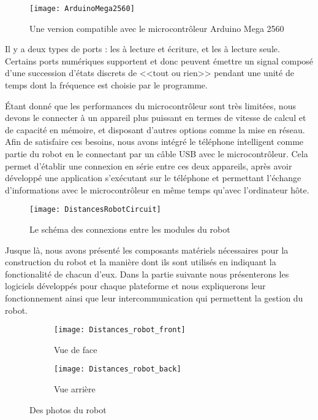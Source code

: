 \begin{figure}[h]
\begin{center}
\texttt{[image: ArduinoMega2560]}
\caption{Une version compatible avec le microcontrôleur Arduino Mega 2560}
\end{center}
\end{figure}

Il y a deux types de ports : les  à lecture et
écriture, et les  à lecture seule. Certains ports
numériques supportent  et donc peuvent
émettre un signal composé d'une succession d'états discrets de <<tout ou rien>>
pendant une unité de temps dont la fréquence est choisie par le programme.

Étant donné que les performances du microcontrôleur sont très limitées, nous
devons le connecter à un appareil plus puissant en termes de vitesse
de calcul et de capacité en mémoire, et disposant d'autres options comme la
mise en réseau. Afin de satisfaire ces besoins, nous avons intégré le téléphone
intelligent  comme partie du robot en le connectant
par un câble USB avec le microcontrôleur. Cela permet d'établir une connexion en série entre
ces deux appareils, après avoir développé une application s'exécutant
sur le téléphone et permettant l'échange d'informations avec le microcontrôleur
en même temps qu'avec l'ordinateur hôte.

\begin{figure}[H]
\begin{center}
\texttt{[image: DistancesRobotCircuit]}
\caption{Le schéma des connexions entre les modules du robot}
\end{center}
\end{figure}

Jusque là, nous avons présenté les composants matériels nécessaires pour la
construction du robot et la manière dont ils sont utilisés en indiquant la
fonctionalité de chacun d'eux. Dans la partie suivante nous présenterons les
logiciels développés pour chaque plateforme et nous expliquerons leur fonctionnement
ainsi que leur intercommunication qui permettent la gestion du robot.

\begin{figure}[h]
\begin{center}
  \begin{subfigure}{0.49\textwidth}
    \texttt{[image: Distances\_robot\_front]}
    \caption{Vue de face}
  \end{subfigure}
  \hfill
  \begin{subfigure}{0.49\textwidth}
    \texttt{[image: Distances\_robot\_back]}
    \caption{Vue arrière}
  \end{subfigure}
  \caption{Des photos du robot}
\end{center}
\end{figure}

